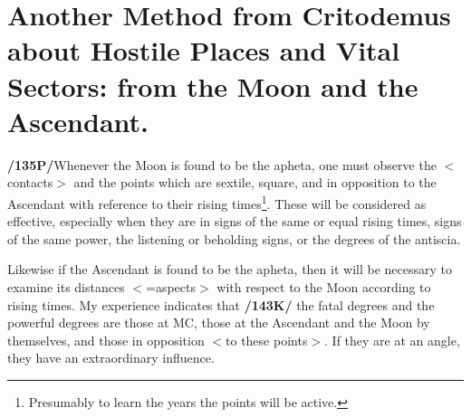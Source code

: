 \section{Another Method from Critodemus about Hostile Places and Vital Sectors: from the Moon and the Ascendant.}

\textbf{/135P/}Whenever the Moon is found to be the apheta, one must observe the $<$contacts$>$ and the points which are sextile, square, and in opposition to the Ascendant with reference to their rising times\footnote{Presumably to learn the years the points will be active.}. These will be considered as effective, especially when they are in signs of the same or equal rising times, signs of the same power, the listening or beholding signs, or the degrees of the antiscia. 

Likewise if the Ascendant is found to be the apheta, then it will be necessary to examine its distances $<$=aspects$>$ with respect to the Moon according to rising times. My experience indicates that \textbf{/143K/} the fatal degrees and the powerful degrees are those at MC, those at the Ascendant and the Moon by themselves, and those in opposition $<$to these points$>$. If they are at an angle, they have an extraordinary influence.

\newpage